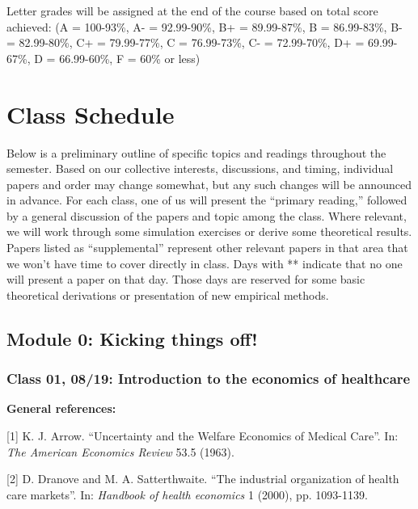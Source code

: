 \documentclass[11pt,]{article}
\begin{document}
Letter grades will be assigned at the end of the course based on total
score achieved: (A = 100-93\%, A- = 92.99-90\%, B+ = 89.99-87\%, B =
86.99-83\%, B- = 82.99-80\%, C+ = 79.99-77\%, C = 76.99-73\%, C- =
72.99-70\%, D+ = 69.99-67\%, D = 66.99-60\%, F = 60\% or less)

\newpage

\hypertarget{class-schedule}{%
\section{Class Schedule}\label{class-schedule}}

Below is a preliminary outline of specific topics and readings
throughout the semester. Based on our collective interests, discussions,
and timing, individual papers and order may change somewhat, but any
such changes will be announced in advance. For each class, one of us
will present the ``primary reading,'' followed by a general discussion
of the papers and topic among the class. Where relevant, we will work
through some simulation exercises or derive some theoretical results.
Papers listed as ``supplemental'' represent other relevant papers in
that area that we won't have time to cover directly in class. Days with
** indicate that no one will present a paper on that day. Those days are
reserved for some basic theoretical derivations or presentation of new
empirical methods.

\hypertarget{module-0-kicking-things-off}{%
\subsection{Module 0: Kicking things
off!}\label{module-0-kicking-things-off}}

\hypertarget{class-01-0819-introduction-to-the-economics-of-healthcare}{%
\subsubsection{Class 01, 08/19: Introduction to the economics of
healthcare}\label{class-01-0819-introduction-to-the-economics-of-healthcare}}

\textbf{General references:}

{[}1{]} K. J. Arrow. ``Uncertainty and the Welfare Economics of Medical
Care''. In: \emph{The American Economics Review} 53.5 (1963).

{[}2{]} D. Dranove and M. A. Satterthwaite. ``The industrial
organization of health care markets''. In: \emph{Handbook of health
economics} 1 (2000), pp. 1093-1139.
\end{document}
